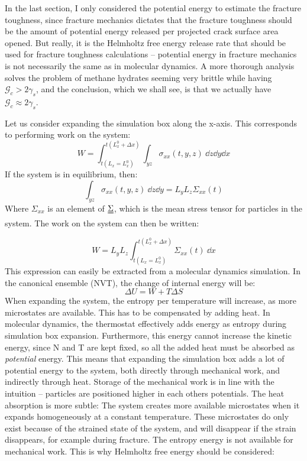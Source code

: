  In the last section, I only considered the potential energy to estimate the fracture toughness, since fracture mechanics dictates that the fracture toughness should be the amount of potential energy released per projected crack surface area opened. But really, it is the Helmholtz free energy release rate that should be used for fracture toughness calculations -- potential energy in fracture mechanics is not necessarily the same as in molecular dynamics. A more thorough analysis solves the problem of methane hydrates seeming very brittle while having $\mathcal{G}_c > 2\gamma_s$, and the conclusion, which we shall see, is that we actually have $\mathcal{G}_c \approx 2\gamma_s$.

Let us consider expanding the simulation box along the x-axis. This corresponds to performing work on the system:
%
\begin{equation}
	W = \int_{t(L_x = L_x^0)}^{t(L_x^0 + \Delta x)} \int_{yz} \sigma_{xx} (t, y, z) \ \dd z \dd y \dd x
\end{equation}
%
If the system is in equilibrium, then:
\begin{equation}
\int_{yz} \sigma_{xx} (t, y, z) \ \dd z \dd y = L_yL_z\Sigma_{xx}(t)	
\end{equation}
Where $\Sigma_{xx}$ is an element of $\uuline \Sigma$, which is the mean stress tensor for particles in the system. The work on the system can then be written:

\begin{equation}
	W = L_y L_z \int_{t(L_x = L_x^0)}^{t(L_x^0 + \Delta x)} \Sigma_{xx}(t) \ \dd x
	\label{eq:work_expansion}
\end{equation}
This expression can easily be extracted from a molecular dynamics simulation.
In the canonical ensemble (NVT), the change of internal energy will be:
\begin{equation}
	\Delta U = W + T\Delta S
\end{equation}
When expanding the system, the entropy per temperature will increase, as more microstates are available. This has to be compensated by adding heat. In molecular dynamics, the thermostat effectively adds energy as entropy during simulation box expansion. Furthermore, this energy cannot increase the kinetic energy, since N and T are kept fixed, so all the added heat must be absorbed as \emph{potential} energy. This means that expanding the simulation box adds a lot of potential energy to the system, both directly through mechanical work, and indirectly through heat. Storage of the mechanical work is in line with the intuition -- particles are positioned higher in each others potentials. The heat absorption is more subtle: The system creates more available microstates when it expands homogeneously at a constant temperature. These microstates do only exist because of the strained state of the system, and will disappear if the strain disappears, for example during fracture. The entropy energy is not available for mechanical work. This is why Helmholtz free energy should be considered:

